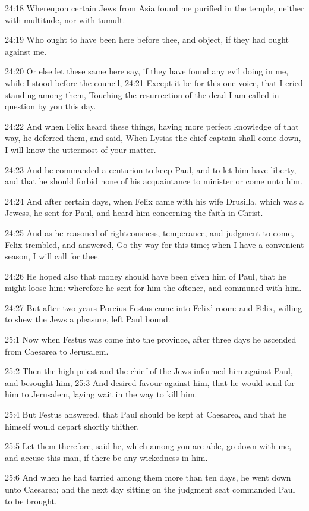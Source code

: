 24:18 Whereupon certain Jews from Asia found me purified in the temple, neither with multitude, nor with tumult.

24:19 Who ought to have been here before thee, and object, if they had ought against me.

24:20 Or else let these same here say, if they have found any evil doing in me, while I stood before the council, 24:21 Except it be for this one voice, that I cried standing among them, Touching the resurrection of the dead I am called in question by you this day.

24:22 And when Felix heard these things, having more perfect knowledge of that way, he deferred them, and said, When Lysias the chief captain shall come down, I will know the uttermost of your matter.

24:23 And he commanded a centurion to keep Paul, and to let him have liberty, and that he should forbid none of his acquaintance to minister or come unto him.

24:24 And after certain days, when Felix came with his wife Drusilla, which was a Jewess, he sent for Paul, and heard him concerning the faith in Christ.

24:25 And as he reasoned of righteousness, temperance, and judgment to come, Felix trembled, and answered, Go thy way for this time; when I have a convenient season, I will call for thee.

24:26 He hoped also that money should have been given him of Paul, that he might loose him: wherefore he sent for him the oftener, and communed with him.

24:27 But after two years Porcius Festus came into Felix' room: and Felix, willing to shew the Jews a pleasure, left Paul bound.

25:1 Now when Festus was come into the province, after three days he ascended from Caesarea to Jerusalem.

25:2 Then the high priest and the chief of the Jews informed him against Paul, and besought him, 25:3 And desired favour against him, that he would send for him to Jerusalem, laying wait in the way to kill him.

25:4 But Festus answered, that Paul should be kept at Caesarea, and that he himself would depart shortly thither.

25:5 Let them therefore, said he, which among you are able, go down with me, and accuse this man, if there be any wickedness in him.

25:6 And when he had tarried among them more than ten days, he went down unto Caesarea; and the next day sitting on the judgment seat commanded Paul to be brought.

